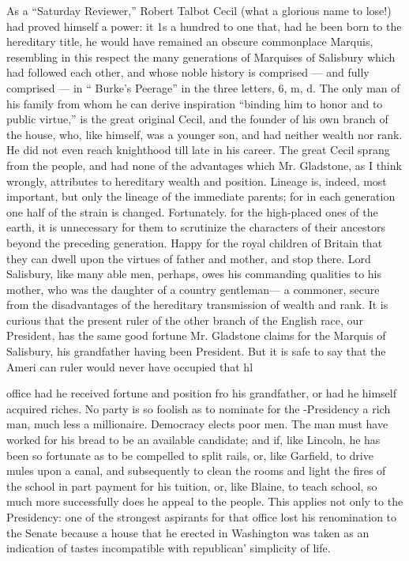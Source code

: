 \documentclass[11pt,openany]{book}
\begin{document}
As a ``Saturday Reviewer,'' Robert Talbot Cecil (what a glorious name to lose!) had proved himself a power: it 1s a hundred to one that, had he been born to the hereditary title, he would have remained an obscure commonplace Marquis, resembling in this respect the many generations of Marquises of Salisbury which had followed each other, and whose noble history is comprised --- and fully comprised --- in `` Burke's Peerage'' in the three letters, 6, m, d. The only man of his family from whom he can derive inspiration ``binding him to honor and to public virtue,'' is the great original Cecil, and the founder of his own branch of the house, who, like himself, was a younger son, and had neither wealth nor rank. He did not even reach knighthood till late in his career. The great Cecil sprang from the people, and had none of the advantages which Mr. Gladstone, as I think wrongly, attributes to hereditary wealth and position. Lineage is, indeed, most important, but only the lineage of the immediate parents; for in each generation one half of the strain is changed. Fortunately. for the high-placed ones of the earth, it is unnecessary for them to scrutinize the characters of their ancestors beyond the preceding generation. Happy for the royal children of Britain that they can dwell upon the virtues of father and mother, and stop there. Lord Salisbury, like many able men, perhaps, owes his commanding qualities to his mother, who was the daughter of a country gentleman--- a commoner, secure from the disadvantages of the hereditary transmission of wealth and rank. It is curious that the present ruler of the other branch of the English race, our President, has the same good fortune Mr. Gladstone claims for the Marquis of Salisbury, his grandfather having been President. But it is safe to say that the Ameri can ruler would never have occupied that hl

office had he received fortune and position fro his grandfather, or had he himself acquired riches. No party is so foolish as to nominate for the -Presidency a rich man, much less a millionaire. Democracy elects poor men. The man must have worked for his bread to be an available candidate; and if, like Lincoln, he has been so fortunate as to be compelled to split rails, or, like Garfield, to drive mules upon a canal, and subsequently to clean the rooms and light the fires of the school in part payment for his tuition, or, like Blaine, to teach school, so much more successfully does he appeal to the people. This applies not only to the Presidency: one of the strongest aspirants for that office lost his renomination to the Senate because a house that he erected in Washington was taken as an indication of tastes incompatible with republican' simplicity of life.
\end{document}
